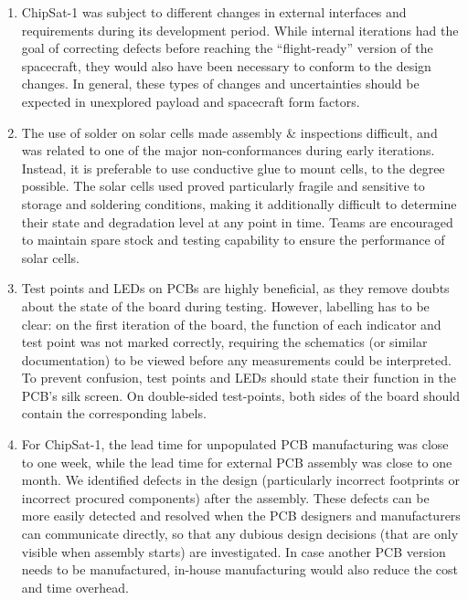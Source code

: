 \documentclass[a4paper,nobib,justified,final]{tufte-book}
\begin{document}
\begin{enumerate}[itemsep=-1ex]
	In the case of ChipSat-1, a lead time of approx.~1 week was required for unpopulated \acs{PCB} procurement, and approx.~1 month for manufacturing. This was often augmented by unpredictable turnaround times for university procurement approval.
	Therefore, teams should consider investing and gaining knowledge regarding in-house manufacturing, especially in electronics and testing equipment.
	\item ChipSat-1 was subject to different changes in external interfaces and requirements during its development period. While internal iterations had the goal of correcting defects before reaching the ``flight-ready'' version of the spacecraft, they would also have been necessary to conform to the design changes. In general, these types of changes and uncertainties should be expected in unexplored payload and spacecraft form factors.
	\item The use of solder on solar cells made assembly \& inspections difficult, and was related to one of the major non-conformances during early iterations. Instead, it is preferable to use conductive glue to mount cells, to the degree possible. The solar cells used proved particularly fragile and sensitive to storage and soldering conditions, making it additionally difficult to determine their state and degradation level at any point in time. Teams are encouraged to maintain spare stock and testing capability to ensure the performance of solar cells.
	\item Test points and \acsp{LED} on \acsp{PCB} are highly beneficial, as they remove doubts about the state of the board during testing. However, labelling has to be clear: on the first iteration of the board, the function of each indicator and test point was not marked correctly, requiring the schematics (or similar documentation) to be viewed before any measurements could be interpreted.
	To prevent confusion, test points and \acsp{LED} should state their function in the \acs{PCB}'s silk screen. On double-sided test-points, both sides of the board should contain the corresponding labels.
	\item For ChipSat-1, the lead time for unpopulated \acs{PCB} manufacturing was close to one week, while the lead time for external \acs{PCB} assembly was close to one month. We identified defects in the design (particularly incorrect footprints or incorrect procured components) after the assembly. These defects can be more easily detected and resolved when the \acs{PCB} designers and manufacturers can communicate directly, so that any dubious design decisions (that are only visible when assembly starts) are investigated. In case another \acs{PCB} version needs to be manufactured, in-house manufacturing would also reduce the cost and time overhead.

\end{enumerate}
\end{document}
